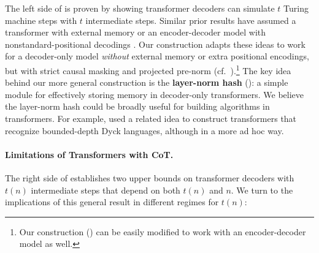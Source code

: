\documentclass{article} %
\newcommand\change[1]{{\color{blue} #1}}
\renewcommand\change[1]{#1}
\newcommand\changeC[1]{{\color{teal} #1}}
\renewcommand\changeC[1]{#1}
\begin{document}
The left side of  is proven by showing transformer decoders can simulate $t$ Turing machine steps with $t$ intermediate steps. Similar prior results have assumed a transformer with external memory \citep{schuurmans2023memory} or an encoder-decoder model with nonstandard-positional decodings \citep{perez2021attention}. Our construction adapts these ideas to work for a decoder-only model \emph{without} external memory or extra positional encodings\change{, but with strict causal masking and \changeC{projected} pre-norm (cf.~\Cref{sec:transformers})}.\footnote{Our construction () can be easily modified to work with an encoder-decoder model as well.}
The key idea behind our more general construction is the \textbf{layer-norm hash} (): a simple module for effectively storing memory in decoder-only transformers.
We believe the layer-norm hash could be broadly useful for building algorithms in transformers.
For example, \citet{yao2021self} used a related idea to construct transformers that recognize bounded-depth Dyck languages, although in a more ad hoc way.

\paragraph{Limitations of Transformers with CoT.}
The right side of  establishes two upper bounds on transformer decoders with $t(n)$ intermediate steps that depend on both $t(n)$ and $n$. We turn to the implications of this general result in different regimes for $t(n)$:
\end{document}
